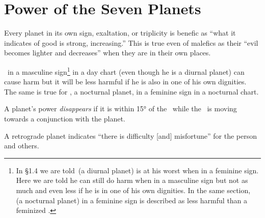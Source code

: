 \section{Power of the Seven Planets}

Every planet in its own sign, exaltation, or triplicity is benefic as ``what it indicates of good is strong, increasing.'' This is true even of malefics as their ``evil becomes lighter and decreases'' when they are in their own places.

\Saturn\, in a masculine sign\footnote{In \S1.4 we are told \Saturn\,(a diurnal planet) is at his worst when in a feminine sign. Here we are told he can still do harm when in a masculine sign but not as much and even less if he is in one of his own dignities. In the same section, \Mars\, (a nocturnal planet) in a feminine sign is described as less harmful than a feminized \Saturn.} in a day chart (even though he is a diurnal planet) can cause harm but it will be less harmful if he is also in one of his own dignities. The same is true for \Mars, a nocturnal planet, in a feminine sign in a nocturnal chart. 

A planet's power \textsl{disappears} if it is within 15° of the \Sun\, while the \Sun\, is moving towards a conjunction with the planet.

A retrograde planet indicates ``there is difficulty [and] misfortune'' for the person and others.

